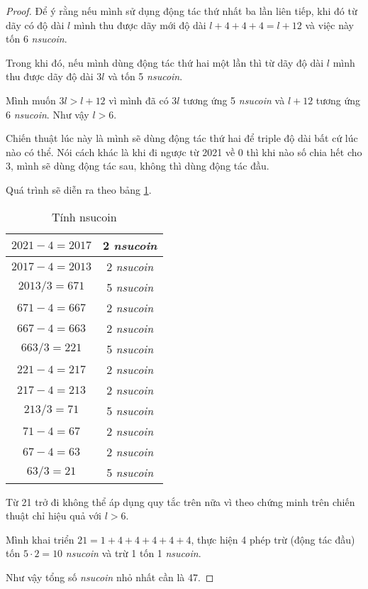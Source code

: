 \begin{proof}
    Để ý rằng nếu mình sử dụng động tác thứ nhất ba lần liên tiếp, khi đó từ dãy có độ dài $l$ mình thu được dãy mới độ dài $l + 4 + 4 + 4 = l + 12$ và việc này tốn 6 \textit{nsucoin}.

    Trong khi đó, nếu mình dùng động tác thứ hai một lần thì từ dãy độ dài $l$ mình thu được dãy độ dài $3l$ và tốn 5 \textit{nsucoin}.

    Mình muốn $3l > l + 12$ vì mình đã có $3l$ tương ứng 5 \textit{nsucoin} và $l + 12$ tương ứng 6 \textit{nsucoin}. Như vậy $l > 6$.

    Chiến thuật lúc này là mình sẽ dùng động tác thứ hai để triple độ dài bất cứ lúc nào có thể. Nói cách khác là khi đi ngược từ 2021 về 0 thì khi nào số chia hết cho 3, mình sẽ dùng động tác sau, không thì dùng động tác đầu.

    Quá trình sẽ diễn ra theo bảng \ref{nsucrypto21:p9}.

    \begin{table}[ht]
        \centering
        \begin{tabular}{|c|c|}
            \hline
            $2021 - 4 = 2017$ & 2 \textit{nsucoin} \\ \hline
            $2017 - 4 = 2013$ & 2 \textit{nsucoin} \\ \hline
            $2013 / 3 = 671$ & 5 \textit{nsucoin} \\ \hline
            $671 - 4 = 667$ & 2 \textit{nsucoin} \\ \hline
            $667 - 4 = 663$ & 2 \textit{nsucoin} \\ \hline
            $663 / 3 = 221$ & 5 \textit{nsucoin} \\ \hline
            $221 - 4 = 217$ & 2 \textit{nsucoin} \\ \hline
            $217 - 4 = 213$ & 2 \textit{nsucoin} \\ \hline
            $213 / 3 = 71$ & 5 \textit{nsucoin} \\ \hline
            $71 - 4 = 67$ & 2 \textit{nsucoin} \\ \hline
            $67 - 4 = 63$ & 2 \textit{nsucoin} \\ \hline
            $63 / 3 = 21$ & 5 \textit{nsucoin} \\ \hline
        \end{tabular}
        \caption{Tính nsucoin}
        \label{nsucrypto21:p9}
    \end{table}

    Từ 21 trở đi không thể áp dụng quy tắc trên nữa vì theo chứng minh trên chiến thuật chỉ hiệu quả với $l > 6$.

    Mình khai triển $21 = 1 + 4 + 4 + 4 + 4 + 4$, thực hiện 4 phép trừ (động tác đầu) tốn $5 \cdot 2 = 10$ \textit{nsucoin} và trừ 1 tốn 1 \textit{nsucoin}.

    Như vậy tổng số \textit{nsucoin} nhỏ nhất cần là 47.
\end{proof}